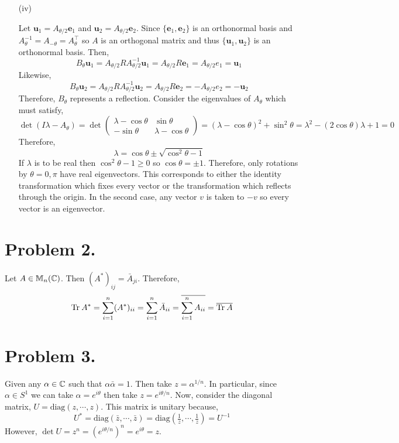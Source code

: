 \documentclass[12pt]{extarticle}
\begin{document}
\begin{enumerate}
\item[(iv)]
\renewcommand{\u}{\mathbf{u}}
\newcommand{\e}{\mathbf{e}}
\newcommand{\Ahalf}{A_{\theta/2}}

Let $\u_1 = \Ahalf \e_1$ and $\u_2 = \Ahalf \e_2$. Since $\{\e_1, \e_2\}$ is an orthonormal basis and $A_\theta^{-1} = A_{-\theta} = A_{\theta}^\top$ so $A$ is an orthogonal matrix and thus $\{\u_1, \u_2\}$ is an orthonormal basis. Then, \[B_\theta \u_1 = \Ahalf R \Ahalf^{-1} \u_1 = \Ahalf R \e_1 = \Ahalf e_1 = \u_1\] Likewise,    
\[B_\theta \u_2 = \Ahalf R \Ahalf^{-1} \u_2 = \Ahalf R \e_2 = - \Ahalf e_2 =  - \u_2\]
Therefore, $B_{\theta}$ represents a reflection. Consider the eigenvalues of $A_\theta$ which must satisfy,
\[ \det{(I \lambda - A_\theta)} = \det{
\begin{pmatrix}
\lambda - \cos{\theta} & \sin{\theta} \\
- \sin{\theta} & \lambda - \cos{\theta}
\end{pmatrix}}
= (\lambda - \cos{\theta})^2 + \sin^2{\theta} = \lambda^2 - (2 \cos{\theta}) \lambda + 1 = 0 \] 
Therefore,
\[ \lambda = \cos{\theta} \pm \sqrt{\cos^2{\theta} - 1} \]
If $\lambda$ is to be real then $\cos^2{\theta} - 1 \ge 0$ so $\cos{\theta} = \pm 1$. Therefore, only rotations by $\theta = 0, \pi$ have real eigenvectors. This corresponds to either the identity transformation which fixes every vector or the transformation which reflects through the origin. In the second case, any vector $v$ is taken to $-v$ so every vector is an eigenvector.  
\end{enumerate}

\section*{Problem 2.}

Let $A \in \mathbb{M}_n(\mathbb{C})$. Then $(A^*)_{ij} = \bar{A}_{ji}$. Therefore,
\[ \mathrm{Tr} \: A^* = \sum_{i = 1}^n (A^*)_{ii} = \sum_{i = 1}^n \bar{A}_{ii} = \overline{\sum_{i = 1}^n A_{ii}} = \overline{\mathrm{Tr} \: A} \]

\section*{Problem 3.}

Given any $\alpha \in \mathbb{C}$ such that $\alpha \bar{\alpha} = 1$. Then take $z = \alpha^{1/n}$. In particular, since $\alpha \in S^1$ we can take $\alpha = e^{i \theta}$ then take $z = e^{i \theta/n}$. Now, consider the diagonal matrix, $U = \mathrm{diag}(z, \cdots, z)$. This matrix is unitary because, \[U^* = \mathrm{diag}(\bar{z}, \cdots, \bar{z}) = \mathrm{diag}(\tfrac{1}{z}, \cdots, \tfrac{1}{z}) = U^{-1}\]
However,  $\det{U} = z^n = (e^{i \theta / n} )^n = e^{i \theta} = z$. 
\end{document}
